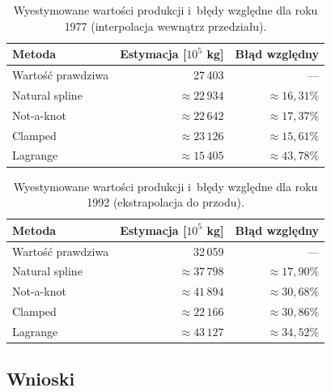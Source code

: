 \documentclass[12pt, a4paper]{article}
\begin{document}
\begin{table}[H]
  \centering
  \caption{Wyestymowane wartości produkcji i~błędy względne dla roku 1977
           (interpolacja wewnątrz przedziału).}
  \begin{tabular}{lrr}
    \toprule
    Metoda & Estymacja [$10^5$ kg] & Błąd względny \\
    \midrule
    Wartość prawdziwa & 27\,403    & --- \\
    Natural spline    & $\approx 22\,934$ & $\approx 16{,}31\%$ \\
    Not-a-knot        & $\approx 22\,642$ & $\approx 17{,}37\%$ \\
    Clamped           & $\approx 23\,126$ & $\approx 15{,}61\%$ \\
    Lagrange          & $\approx 15\,405$ & $\approx 43{,}78\%$ \\
    \bottomrule
  \end{tabular}
  \label{tab:cytrusy_1977}
\end{table}

\begin{table}[H]
  \centering
  \caption{Wyestymowane wartości produkcji i~błędy względne dla roku 1992
           (ekstrapolacja do przodu).}
  \begin{tabular}{lrr}
    \toprule
    Metoda & Estymacja [$10^5$ kg] & Błąd względny \\
    \midrule
    Wartość prawdziwa & 32\,059    & --- \\
    Natural spline    & $\approx 37\,798$ & $\approx 17{,}90\%$ \\
    Not-a-knot        & $\approx 41\,894$ & $\approx 30{,}68\%$ \\
    Clamped           & $\approx 22\,166$ & $\approx 30{,}86\%$ \\
    Lagrange          & $\approx 43\,127$ & $\approx 34{,}52\%$ \\
    \bottomrule
  \end{tabular}
  \label{tab:cytrusy_1992}
\end{table}

\subsection{Wnioski}
\end{document}
